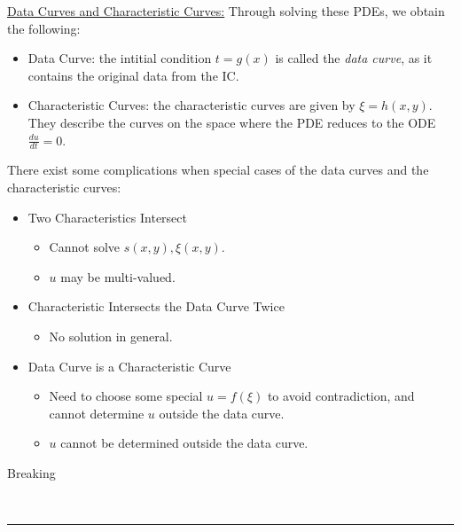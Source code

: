\documentclass{article}
\newcommand{\header}[1]{\begin{large}\noindent #1\end{large}\\\rule{\textwidth}{0.5pt}}
\newcommand{\sheader}[1]{\underline{#1:}}
\begin{document}
\sheader{Data Curves and Characteristic Curves}
Through solving these PDEs, we obtain the following:
\begin{itemize}
    \item Data Curve: the intitial condition $t = g(x)$ is called the \textit{data curve},
    as it contains the original data from the IC.
    \item Characteristic Curves: the characteristic curves are given by $\xi = h(x, y)$.
    They describe the curves on the space where the PDE reduces to the ODE $\frac{du}{dt} = 0$.
\end{itemize}

There exist some complications when special cases of the data curves and the 
characteristic curves:
\begin{itemize}
    \item Two Characteristics Intersect
    \begin{itemize}
        \item Cannot solve $s(x, y), \xi(x, y)$.
        \item $u$ may be multi-valued.
    \end{itemize}
    \item Characteristic Intersects the Data Curve Twice
    \begin{itemize}
        \item No solution in general.
    \end{itemize}
    \item Data Curve is a Characteristic Curve
    \begin{itemize}
        \item Need to choose some special $u = f(\xi)$ to avoid contradiction,
        and cannot determine $u$ outside the data curve.
        \item $u$ cannot be determined outside the data curve.
    \end{itemize}
\end{itemize}

\header{Breaking}
\end{document}
